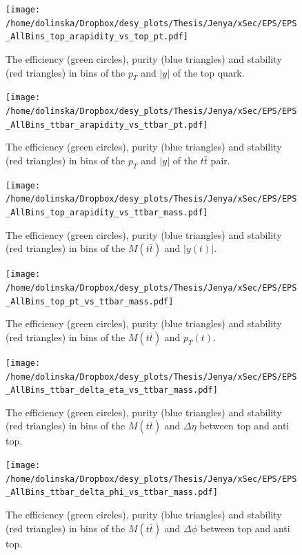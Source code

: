 

\begin{figure}[p]
  \centering
  \texttt{[image: /home/dolinska/Dropbox/desy\_plots/Thesis/Jenya/xSec/EPS/EPS\_AllBins\_top\_arapidity\_vs\_top\_pt.pdf]}
  \caption{The efficiency (green circles), purity (blue triangles) and stability (red triangles) in bins of the $p_{T}$ and $|y|$ of the top quark.}
  \label{fig:EPS_2D_y_pt}
\end{figure}

\begin{figure}[p]
  \centering
  \texttt{[image: /home/dolinska/Dropbox/desy\_plots/Thesis/Jenya/xSec/EPS/EPS\_AllBins\_ttbar\_arapidity\_vs\_ttbar\_pt.pdf]}
  \caption{The efficiency (green circles), purity (blue triangles) and stability (red triangles) in bins of the $p_{T}$ and $|y|$ of the $t\bar{t}$ pair.}
  \label{fig:EPS_2D_ptt_ytt}
\end{figure}

\begin{figure}[p]
  \centering
  \texttt{[image: /home/dolinska/Dropbox/desy\_plots/Thesis/Jenya/xSec/EPS/EPS\_AllBins\_top\_arapidity\_vs\_ttbar\_mass.pdf]}
  \caption{The efficiency (green circles), purity (blue triangles) and stability (red triangles) in bins of the $M(t\bar{t})$ and $|y(t)|$.}
  \label{fig:EPS_2D_Mtt_yt}
\end{figure}

\begin{figure}[p]
  \centering
  \texttt{[image: /home/dolinska/Dropbox/desy\_plots/Thesis/Jenya/xSec/EPS/EPS\_AllBins\_top\_pt\_vs\_ttbar\_mass.pdf]}
  \caption{The efficiency (green circles), purity (blue triangles) and stability (red triangles) in bins of the $M(t\bar{t})$ and $p_{T}(t)$.}
  \label{fig:EPS_2D_Mtt_pt}
\end{figure}

\begin{figure}[p]
  \centering
  \texttt{[image: /home/dolinska/Dropbox/desy\_plots/Thesis/Jenya/xSec/EPS/EPS\_AllBins\_ttbar\_delta\_eta\_vs\_ttbar\_mass.pdf]}
  \caption{The efficiency (green circles), purity (blue triangles) and stability (red triangles) in bins of the $M(t\bar{t})$ and $\Delta\eta$ between top and anti top.}
  \label{fig:EPS_2D_Mtt_eta}
\end{figure}

\begin{figure}[p]
  \centering
  \texttt{[image: /home/dolinska/Dropbox/desy\_plots/Thesis/Jenya/xSec/EPS/EPS\_AllBins\_ttbar\_delta\_phi\_vs\_ttbar\_mass.pdf]}
  \caption{The efficiency (green circles), purity (blue triangles) and stability (red triangles) in bins of the $M(t\bar{t})$ and $\Delta\phi$ between top and anti top.}
  \label{fig:EPS_2D_Mtt_phi}
\end{figure}

